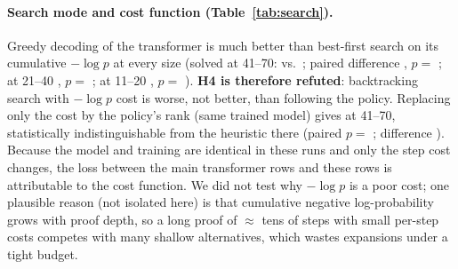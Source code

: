 \paragraph{Search mode and cost function (Table~\ref{tab:search}).} Greedy decoding of the transformer is much better than best-first search on its cumulative $-\log p$ at every size (solved at 41--70:  vs.\ ; paired difference , $p=$ ; at 21--40 , $p=$ ; at 11--20 , $p=$ ). \textbf{H4 is therefore refuted}: backtracking search with $-\log p$ cost is worse, not better, than following the policy. Replacing only the cost by the policy's rank (same trained model) gives  at 41--70, statistically indistinguishable from the heuristic there (paired $p=$ ; difference ). Because the model and training are identical in these runs and only the step cost changes, the loss between the main transformer rows and these rows is attributable to the cost function. We did not test why $-\log p$ is a poor cost; one plausible reason (not isolated here) is that cumulative negative log-probability grows with proof depth, so a long proof of $\approx$ tens of steps with small per-step costs competes with many shallow alternatives, which wastes expansions under a tight budget.

\begin{table}[t]\centering\caption{Search-mode and cost ablations (post-hoc variants of the main systems; \emph{rank cost}: step cost is the tactic's rank under the policy; \emph{greedy}: top-1 only). Same trained models as the main table.}\label{tab:search}
\resizebox{\columnwidth}{!}{}
\end{table}

